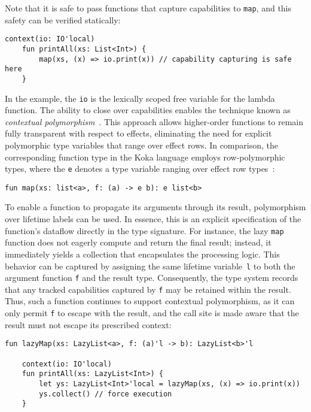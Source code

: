 \documentclass[acmsmall,review,screen]{acmart}
\begin{document}
Note that it is safe to pass functions that capture capabilities to \lstinline[language=colang]|map|, and this safety can be verified statically:
\begin{lstlisting}[language=colang]
    context(io: IO'local)
    fun printAll(xs: List<Int>) {
        map(xs, (x) => io.print(x)) // capability capturing is safe here
    }
\end{lstlisting}

In the example, the \lstinline[language=colang]|io| is the lexically scoped free variable for the lambda function.
The ability to close over capabilities enables the technique known as \textit{contextual polymorphism}~\cite{brachthauser2020effects, brachthauser2022effects}.
This approach allows higher-order functions to remain fully transparent with respect to effects, eliminating the need for explicit polymorphic type variables that range over effect rows.
In comparison, the corresponding function type in the Koka language employs row-polymorphic types, where the \lstinline[language=colang]|e| denotes a type variable ranging over effect row types~\cite{leijen2014koka}:
\begin{lstlisting}[language=colang]
    fun map(xs: list<a>, f: (a) -> e b): e list<b>
\end{lstlisting}

To enable a function to propagate its arguments through its result, polymorphism over lifetime labels can be used.
In essence, this is an explicit specification of the function’s dataflow directly in the type signature.
For instance, the lazy \lstinline[language=colang]|map| function does not eagerly compute and return the final result; instead, it immediately yields a collection that encapsulates the processing logic.
This behavior can be captured by assigning the same lifetime variable~\lstinline[language=colang]|l| to both the argument function \lstinline[language=colang]|f| and the result type.
Consequently, the type system records that any tracked capabilities captured by \lstinline[language=colang]|f| may be retained within the result.
Thus, such a function continues to support contextual polymorphism, as it can only permit \texttt{f} to escape with the result, and the call site is made aware that the result must not escape its prescribed context:
\begin{lstlisting}[language=colang]
    fun lazyMap(xs: LazyList<a>, f: (a)'l -> b): LazyList<b>'l

    context(io: IO'local)
    fun printAll(xs: LazyList<Int>) {
        let ys: LazyList<Int>'local = lazyMap(xs, (x) => io.print(x))
        ys.collect() // force execution
    }
\end{lstlisting}
\end{document}
